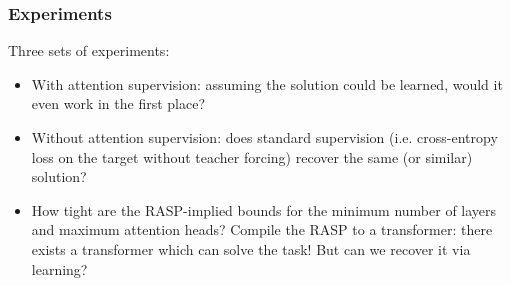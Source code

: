\documentclass[mathserif,notheorems]{beamer}
\theoremstyle{plain} %
\theoremstyle{definition} %
\begin{document}
  \begin{frame}
    \frametitle{Experiments}
    Three sets of experiments:
    \begin{itemize}
      \item With attention supervision: assuming the solution could be learned, would it even work in the first place?
      \item Without attention supervision: does standard supervision (i.e. cross-entropy loss on the target without teacher forcing) recover the same (or similar) solution?
      \item How tight are the RASP-implied bounds for the minimum number of layers and maximum attention heads? Compile the RASP to a transformer: there exists a transformer which can solve the task! But can we recover it via learning?
    \end{itemize}
  \end{frame}


\end{document}

